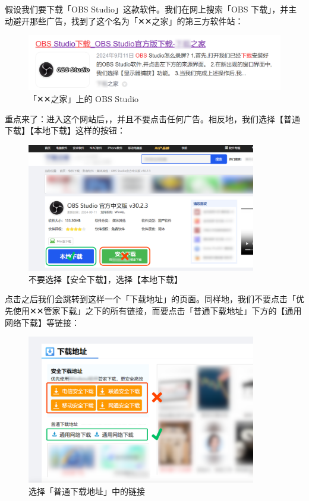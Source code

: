假设我们要下载「OBS Studio」这款软件。我们在网上搜索「OBS 下载」，并主动避开那些广告，找到了这个名为「✕✕之家」的第三方软件站：

\begin{figure}[htb!]
  \centering
  \includegraphics[width=.7\textwidth]{assets/basic/OBS_third_party.png}
  \caption{「✕✕之家」上的 OBS Studio}
  \label{fig:OBS_third_party}
\end{figure}

重点来了：进入这个网站后，，并且不要点击任何广告。相反地，我们选择【普通下载】【本地下载】这样的按钮：

\begin{figure}[htb!]
  \centering
  \includegraphics[width=10cm]{assets/basic/Download_page_1.png}
  \caption{不要选择【安全下载】，选择【本地下载】}
  \label{fig:Download_page_1}
\end{figure}

点击之后我们会跳转到这样一个「下载地址」的页面。同样地，我们不要点击「优先使用✕✕管家下载」之下的所有链接，而要点击「普通下载地址」下方的【通用网络下载】等链接：

\begin{figure}[htb!]
  \centering
  \includegraphics[width=10cm]{assets/basic/Download_page_2.png}
  \caption{选择「普通下载地址」中的链接}
  \label{fig:Download_page_2}
\end{figure}

